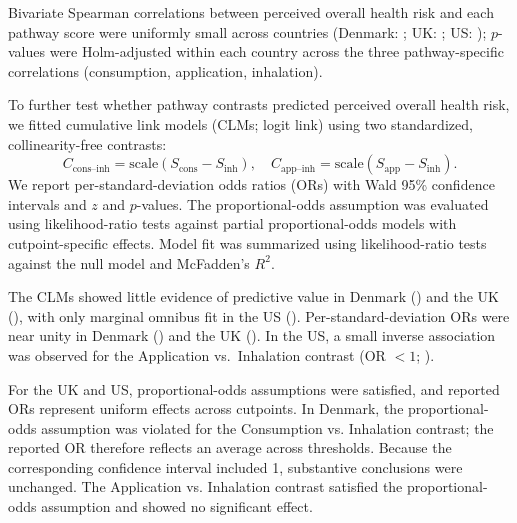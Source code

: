 Bivariate Spearman correlations between perceived overall health risk and each pathway score were uniformly small across countries (Denmark: ; UK: ; US: ); $p$-values were Holm-adjusted within each country across the three pathway-specific correlations (consumption, application, inhalation).

To further test whether pathway contrasts predicted perceived overall health risk, we fitted cumulative link models (CLMs; logit link) using two standardized, collinearity-free contrasts:
\[
C_{\mathrm{cons\text{--}inh}} = \mathrm{scale}(S_{\mathrm{cons}} - S_{\mathrm{inh}}), \quad
C_{\mathrm{app\text{--}inh}} = \mathrm{scale}(S_{\mathrm{app}} - S_{\mathrm{inh}}).
\]
We report per-standard-deviation odds ratios (ORs) with Wald 95\% confidence intervals and $z$ and $p$-values. The proportional-odds assumption was evaluated using likelihood-ratio tests against partial proportional-odds models with cutpoint-specific effects. Model fit was summarized using likelihood-ratio tests against the null model and McFadden's $R^2$.

The CLMs showed little evidence of predictive value in Denmark () and the UK (), with only marginal omnibus fit in the US (). Per-standard-deviation ORs were near unity in Denmark () and the UK (). In the US, a small inverse association was observed for the Application vs.\ Inhalation contrast (OR $< 1$; ).

For the UK and US, proportional-odds assumptions were satisfied, and reported ORs represent uniform effects across cutpoints. In Denmark, the proportional-odds assumption was violated for the Consumption vs. Inhalation contrast; the reported OR therefore reflects an average across thresholds. Because the corresponding confidence interval included 1, substantive conclusions were unchanged. The Application vs. Inhalation contrast satisfied the proportional-odds assumption and showed no significant effect.


